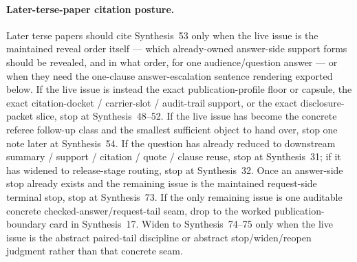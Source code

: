 \documentclass[11pt]{article}
\begin{document}
\paragraph{Later-terse-paper citation posture.}
Later terse papers should cite Synthesis~53 only when the live issue is the maintained reveal order itself --- which already-owned answer-side support forms should be revealed, and in what order, for one audience/question answer --- or when they need the one-clause answer-escalation sentence rendering exported below. If the live issue is instead the exact publication-profile floor or capsule, the exact citation-docket / carrier-slot / audit-trail support, or the exact disclosure-packet slice, stop at Synthesis~48--52. If the live issue has become the concrete referee follow-up class and the smallest sufficient object to hand over, stop one note later at Synthesis~54. If the question has already reduced to downstream summary / support / citation / quote / clause reuse, stop at Synthesis~31; if it has widened to release-stage routing, stop at Synthesis~32. Once an answer-side stop already exists and the remaining issue is the maintained request-side terminal stop, stop at Synthesis~73. If the only remaining issue is one auditable concrete checked-answer/request-tail seam, drop to the worked publication-boundary card in Synthesis~17. Widen to Synthesis~74--75 only when the live issue is the abstract paired-tail discipline or abstract stop/widen/reopen judgment rather than that concrete seam.\cite{series:challengeanswercarrierslots,series:challengeansweraudittrails,series:challengeanswercitationdockets,series:challengeanswerpublicationprofiles,series:challengeanswerdisclosurepackets,series:challengeanswerreviewmenus,series:downstreamnormalforms,series:releasespine,series:workedexample,series:pairedterminalcitationdiscipline,series:pairedterminalcutoverrules}
\end{document}
